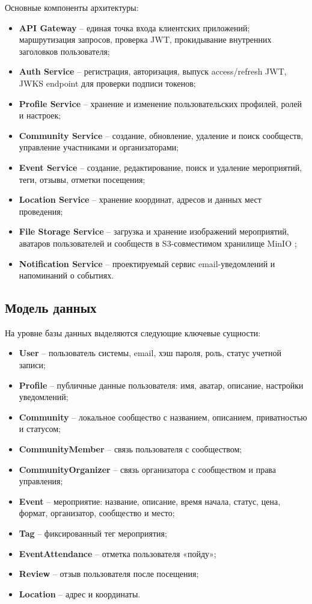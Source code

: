 
Основные компоненты архитектуры:
\begin{itemize}
    \item \textbf{API Gateway} -- единая точка входа клиентских приложений; маршрутизация запросов, проверка JWT, прокидывание внутренних заголовков пользователя;
    \item \textbf{Auth Service} -- регистрация, авторизация, выпуск access/refresh JWT, JWKS endpoint для проверки подписи токенов;
    \item \textbf{Profile Service} -- хранение и изменение пользовательских профилей, ролей и настроек;
    \item \textbf{Community Service} -- создание, обновление, удаление и поиск сообществ, управление участниками и организаторами;
    \item \textbf{Event Service} -- создание, редактирование, поиск и удаление мероприятий, теги, отзывы, отметки посещения;
    \item \textbf{Location Service} -- хранение координат, адресов и данных мест проведения;
    \item \textbf{File Storage Service} -- загрузка и хранение изображений мероприятий, аватаров пользователей и сообществ в S3-совместимом хранилище MinIO \cite{minio};
    \item \textbf{Notification Service} -- проектируемый сервис email-уведомлений и напоминаний о событиях.
\end{itemize}

\subsection{Модель данных}

На уровне базы данных выделяются следующие ключевые сущности:
\begin{itemize}
    \item \textbf{User} -- пользователь системы, email, хэш пароля, роль, статус учетной записи;
    \item \textbf{Profile} -- публичные данные пользователя: имя, аватар, описание, настройки уведомлений;
    \item \textbf{Community} -- локальное сообщество с названием, описанием, приватностью и статусом;
    \item \textbf{CommunityMember} -- связь пользователя с сообществом;
    \item \textbf{CommunityOrganizer} -- связь организатора с сообществом и права управления;
    \item \textbf{Event} -- мероприятие: название, описание, время начала, статус, цена, формат, организатор, сообщество и место;
    \item \textbf{Tag} -- фиксированный тег мероприятия;
    \item \textbf{EventAttendance} -- отметка пользователя «пойду»;
    \item \textbf{Review} -- отзыв пользователя после посещения;
    \item \textbf{Location} -- адрес и координаты.
\end{itemize}

